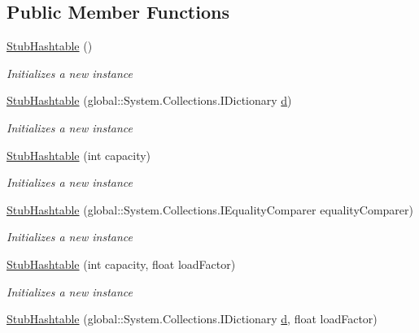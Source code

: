 \subsection*{Public Member Functions}
\begin{DoxyCompactItemize}
\item 
\hyperlink{class_system_1_1_collections_1_1_fakes_1_1_stub_hashtable_a5debac3bec826f39636bf902c4e8f692}{Stub\-Hashtable} ()
\begin{DoxyCompactList}\small\item\em Initializes a new instance\end{DoxyCompactList}\item 
\hyperlink{class_system_1_1_collections_1_1_fakes_1_1_stub_hashtable_a77703b55fb7ab8165a8ee52bdca3d8d7}{Stub\-Hashtable} (global\-::\-System.\-Collections.\-I\-Dictionary \hyperlink{bootstrap_8min_8js_aeb337d295abaddb5ec3cb34cc2e2bbc9}{d})
\begin{DoxyCompactList}\small\item\em Initializes a new instance\end{DoxyCompactList}\item 
\hyperlink{class_system_1_1_collections_1_1_fakes_1_1_stub_hashtable_a569d887f43fdaf106e464d789db3c283}{Stub\-Hashtable} (int capacity)
\begin{DoxyCompactList}\small\item\em Initializes a new instance\end{DoxyCompactList}\item 
\hyperlink{class_system_1_1_collections_1_1_fakes_1_1_stub_hashtable_a5c862a518d8779d5353254e65890133b}{Stub\-Hashtable} (global\-::\-System.\-Collections.\-I\-Equality\-Comparer equality\-Comparer)
\begin{DoxyCompactList}\small\item\em Initializes a new instance\end{DoxyCompactList}\item 
\hyperlink{class_system_1_1_collections_1_1_fakes_1_1_stub_hashtable_aa8c85d19f05484089b86056b081bd6c4}{Stub\-Hashtable} (int capacity, float load\-Factor)
\begin{DoxyCompactList}\small\item\em Initializes a new instance\end{DoxyCompactList}\item 
\hyperlink{class_system_1_1_collections_1_1_fakes_1_1_stub_hashtable_a48df6ff24550ea708313e487ff9aa5ef}{Stub\-Hashtable} (global\-::\-System.\-Collections.\-I\-Dictionary \hyperlink{bootstrap_8min_8js_aeb337d295abaddb5ec3cb34cc2e2bbc9}{d}, float load\-Factor)

\end{DoxyCompactItemize}
